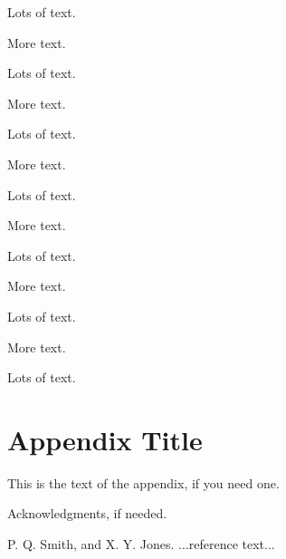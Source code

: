 \documentclass{sigplanconf}
\begin{document}
Lots of text.

More text.

Lots of text.

More text.

Lots of text.

More text.

Lots of text.

More text.

Lots of text.

More text.

Lots of text.

More text.

Lots of text.

\appendix
\section{Appendix Title}

This is the text of the appendix, if you need one.

\acks

Acknowledgments, if needed.





\begin{thebibliography}{}
\softraggedright

P. Q. Smith, and X. Y. Jones. ...reference text...

\end{thebibliography}
\end{document}
